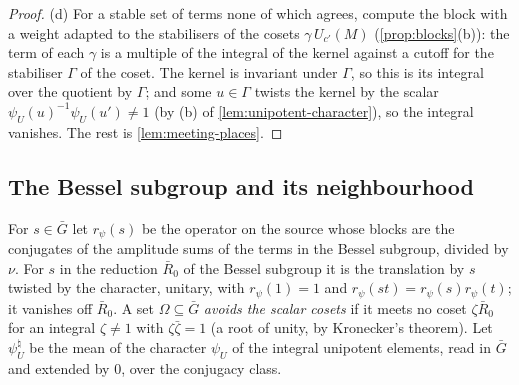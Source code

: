 \begin{proof}
(d) For a stable set of terms none of which agrees, compute the block with a weight adapted to the stabilisers of the cosets $\gamma\,U_{c'}(M)$ (\cref{prop:blocks}(b)): the term of each $\gamma$ is a multiple of the integral of the kernel against a cutoff for the stabiliser
$\Gamma$ of the coset. The kernel is invariant under $\Gamma$, so this is its integral over the quotient by $\Gamma$; and some $u\in\Gamma$ twists the kernel by the scalar $\psi_U(u)^{-1}\psi_U(u')\ne1$ (by (b) of \cref{lem:unipotent-character}), so the integral vanishes. The rest is
\cref{lem:meeting-places}.
\end{proof}

\subsection{The Bessel subgroup and its neighbourhood}\label{ss:near-bessel}
For $s\in\bar G$ let $r_\psi(s)$ be the operator on the source whose blocks are the conjugates of the amplitude sums of the terms in the Bessel subgroup, divided by $\nu$. For $s$ in the reduction
$\bar R_0$ of the Bessel subgroup it is the translation by $s$ twisted by the character, unitary, with $r_\psi(1)=1$ and $r_\psi(st)=r_\psi(s)r_\psi(t)$; it vanishes off $\bar R_0$. A set $\Omega\subseteq\bar G$
\emph{avoids the scalar cosets} if it meets no coset $\zeta\bar R_0$ for an integral $\zeta\ne1$ with $\zeta\bar\zeta=1$ (a root of unity, by Kronecker's theorem). Let $\psi_U^\natural$ be the mean of the
character $\psi_U$ of the integral unipotent elements, read in $\bar G$ and extended by $0$, over the conjugacy class.

